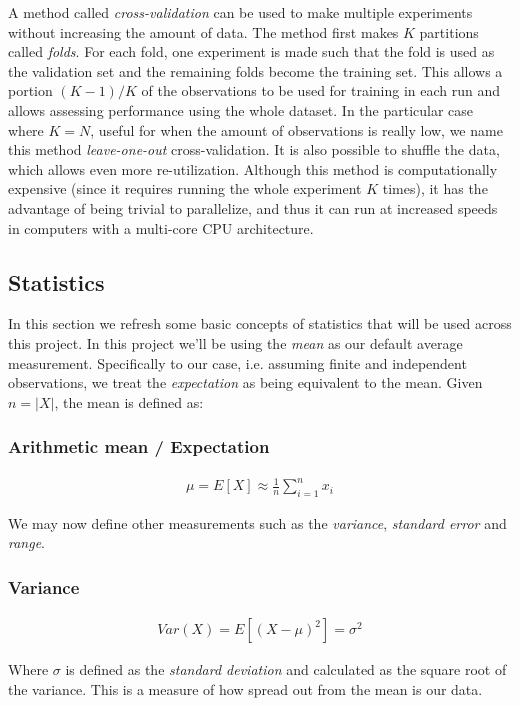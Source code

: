 A method called \emph{cross-validation} can be used to make mul\-ti\-ple experiments with\-out increasing the amount of data. The method first makes $K$ partitions called \emph{folds}. For each fold, one experiment is made such that the fold is used as the validation set and the remaining folds become the training set. This allows a portion $(K-1)/K$ of the observations to be used for training in each run and allows assessing performance using the whole dataset. In the particular case where $K = N$, useful for when the amount of observations is really low, we name this method \emph{leave-one-out} cross-validation. It is also possible to shuffle the data, which allows even more re-utilization. Although this method is computationally expensive (since it requires running the whole experiment $K$ times), it has the advantage of being trivial to parallelize, and thus it can run at increased speeds in computers with a multi-core CPU architecture. 

\subsection{Statistics}
\label{sec:ch4.statistics}

In this section we refresh some basic concepts of statistics that will be used across this project. In this project we'll be using the \emph{mean} as our default average measurement. Specifically to our case, i.e. assuming finite and independent observations, we treat the \emph{expectation} as being equivalent to the mean. Given $n = |X|$, the mean is defined as:

\subsubsection*{Arithmetic mean / Expectation }
\begin{align*}
    \mu = E[X] \approx \frac{1}{n} \sum_{i = 1}^{n} x_i
\end{align*}

We may now define other measurements such as the \emph{variance}, \emph{standard error} and \emph{range}.

\subsubsection*{Variance}
\begin{align*}
    Var(X) = E[(X - \mu)^2] = \sigma^2
\end{align*}

Where $\sigma$ is defined as the \emph{standard deviation} and calculated as the square root of the variance. This is a measure of how spread out from the mean is our data.

